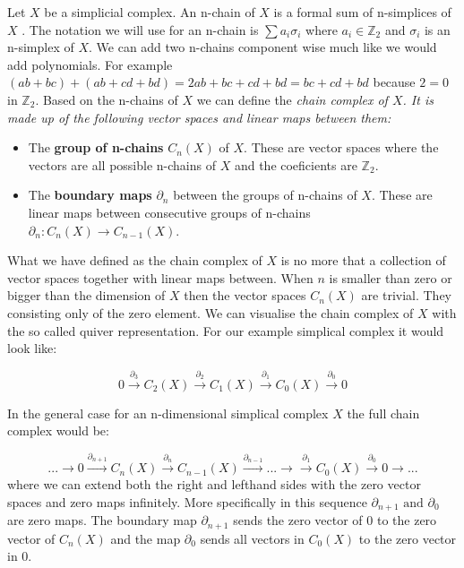 Let $X$ be a simplicial complex. An n-chain of $X$ is a formal sum of n-simplices of $X$ \cite{comp-topo}. The notation we will use for an n-chain is $\sum{a_i \sigma_i}$ where $a_i \in \mathbb{Z}_2$ and $\sigma_i$ is an n-simplex of $X$. We can add two n-chains component wise much like we would add polynomials. For example $(ab + bc) + (ab + cd + bd) = 2ab + bc + cd + bd = bc + cd + bd$ because $2 = 0$ in $\mathbb{Z}_2$. Based on the n-chains of $X$ we can define the \em chain complex \em of $X$. It is made up of the following vector spaces and linear maps between them:


\begin{itemize}

    \item The \textbf{group of n-chains} $C_n(X)$ of $X$. These are vector spaces where the vectors are all possible n-chains of $X$ and the coeficients are $\mathbb{Z}_2$.

    \item The \textbf{boundary maps} $\partial_n$ between the groups of n-chains of $X$. These are linear maps between consecutive groups of n-chains $\partial_n : C_n(X) \to C_{n-1}(X)$.

\end{itemize}

What we have defined as the chain complex of $X$ is no more that a collection of vector spaces together with linear maps between. When $n$ is smaller than zero or bigger than the dimension of $X$ then the vector spaces $C_n(X)$ are trivial. They consisting only of the zero element. We can visualise the chain complex of $X$ with the so called quiver representation. For our example simplical complex it would look like:

$$ 0 \overset{\partial_{3}}{\longrightarrow} C_2(X) \overset{\partial_{2}}{\longrightarrow} C_{1}(X) \overset{\partial_{1}}{\longrightarrow} C_{0}(X) \overset{\partial_0}{\longrightarrow}  0 $$

In the general case for an n-dimensional simplical complex $X$ the full chain complex would be:

$$ ... \longrightarrow 0 \overset{\partial_{n+1}}{\longrightarrow} C_n(X) \overset{\partial_{n}}{\longrightarrow} C_{n-1}(X) \overset{\partial_{n-1}}{\longrightarrow} ... \longrightarrow  \overset{\partial_1}{\longrightarrow} C_0(X) \overset{\partial_0}{\longrightarrow} 0 \longrightarrow ... $$
where we can extend both the right and lefthand sides with the zero vector spaces and zero maps infinitely. More specifically in this sequence $\partial_{n+1} \text{ and } \partial_{0}$ are zero maps. The boundary map $\partial_{n+1}$ sends the zero vector of $0$ to the zero vector of $C_n(X)$ and the map $\partial_0$ sends all vectors in $C_0(X)$ to the zero vector in $0$.

